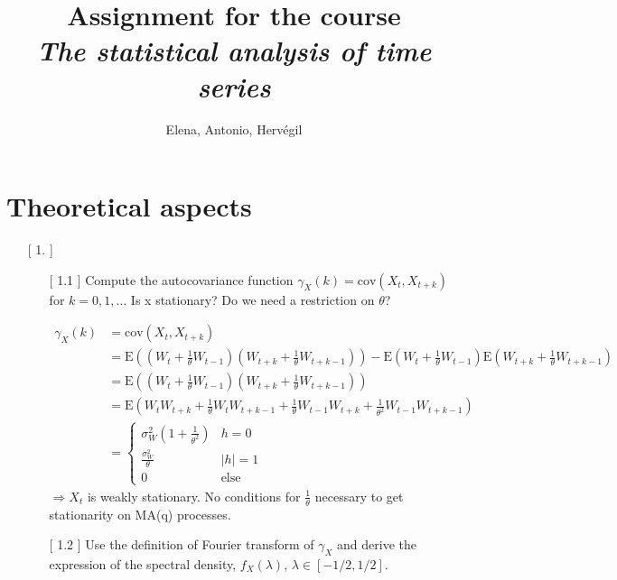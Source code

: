 \documentclass[10pt,a4paper]{article}
\author{Elena, Antonio, Hervégil}
\title{Assignment for the course \\ \textit{The statistical analysis of time series}}
\begin{document}
	\maketitle
	\newpage
	\section{Theoretical aspects}
	\begin{enumerate}
	\item[[ 1.]] \begin{enumerate}
			\item[[ 1.1]] Compute the autocovariance function $\gamma_{X} (k) = \text{cov}(X_t,X_{t+k})$ for $k=0,1,\dots$ Is { \selectfont \large  x } stationary? Do we need a restriction on $\theta$?
			
			\begin{align*}
				\gamma_{X}(k) &= \text{cov}(X_t,X_{t+k}) \\
				&= \text{E}((W_t+\frac{1}{\theta} W_{t-1})(W_{t+k}+\frac{1}{\theta}W_{t+k-1})) - \text{E}(W_t+\frac{1}{\theta} W_{t-1})\text{E}(W_{t+k}+\frac{1}{\theta}W_{t+k-1}) \\
				&= \text{E}((W_t+\frac{1}{\theta} W_{t-1})(W_{t+k}+\frac{1}{\theta}W_{t+k-1})) \\
				&= \text{E}(W_tW_{t+k} + \frac{1}{\theta} W_tW_{t+k-1}+\frac{1}{\theta} W_{t-1}W_{t+k} + \frac{1}{\theta^2} W_{t-1}W_{t+k-1}) \\
				&= 	\left\{
							\begin{array}{ll}
								\sigma^2_{W} (1+\frac{1}{\theta^2}) & h=0\\
								\frac{\sigma^2_{W}}{\theta} & |h|=1\\
								0 & \text{else}
							\end{array}
					\right.			
			\end{align*}		
			$\Rightarrow X_{t}$ is weakly stationary. No conditions for $\frac{1}{\theta}$ necessary to get stationarity on MA(q) processes. 
			
			
			
			\item[[ 1.2]] Use the definition of Fourier transform of $\gamma_X$ and derive the expression of the spectral density, $f_X(\lambda)$, $\lambda \in \left[-1/2,1/2\right]$.
			

\end{enumerate}
\end{enumerate}
\end{document}
